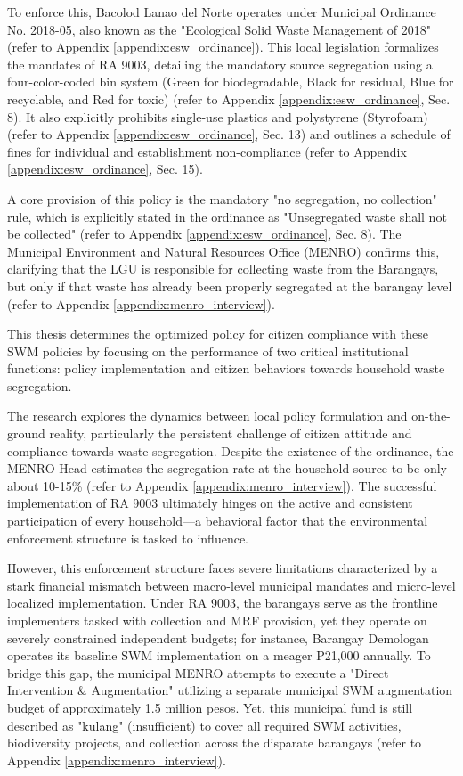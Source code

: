 To enforce this, Bacolod Lanao del Norte operates under Municipal Ordinance No. 2018-05, also known as the "Ecological Solid Waste Management of 2018" (refer to Appendix \ref{appendix:esw_ordinance}). This local legislation formalizes the mandates of RA 9003, detailing the mandatory source segregation using a four-color-coded bin system (Green for biodegradable, Black for residual, Blue for recyclable, and Red for toxic) (refer to Appendix \ref{appendix:esw_ordinance}, Sec. 8). It also explicitly prohibits single-use plastics and polystyrene (Styrofoam) (refer to Appendix \ref{appendix:esw_ordinance}, Sec. 13) and outlines a schedule of fines for individual and establishment non-compliance (refer to Appendix \ref{appendix:esw_ordinance}, Sec. 15).

A core provision of this policy is the mandatory "no segregation, no collection" rule, which is explicitly stated in the ordinance as "Unsegregated waste shall not be collected" (refer to Appendix \ref{appendix:esw_ordinance}, Sec. 8). The Municipal Environment and Natural Resources Office (MENRO) confirms this, clarifying that the LGU is responsible for collecting waste from the Barangays, but only if that waste has already been properly segregated at the barangay level (refer to Appendix \ref{appendix:menro_interview}).

This thesis determines the optimized policy for citizen compliance with these SWM policies by focusing on the performance of two critical institutional functions: policy implementation and citizen behaviors towards household waste segregation.

The research explores the dynamics between local policy formulation and on-the-ground reality, particularly the persistent challenge of citizen attitude and compliance towards waste segregation. Despite the existence of the ordinance, the MENRO Head estimates the segregation rate at the household source to be only about 10-15\% (refer to Appendix \ref{appendix:menro_interview}). The successful implementation of RA 9003 ultimately hinges on the active and consistent participation of every household—a behavioral factor that the environmental enforcement structure is tasked to influence.

However, this enforcement structure faces severe limitations characterized by a stark financial mismatch between macro-level municipal mandates and micro-level localized implementation. Under RA 9003, the barangays serve as the frontline implementers tasked with collection and MRF provision, yet they operate on severely constrained independent budgets; for instance, Barangay Demologan operates its baseline SWM implementation on a meager ₱21,000 annually. To bridge this gap, the municipal MENRO attempts to execute a "Direct Intervention \& Augmentation" utilizing a separate municipal SWM augmentation budget of approximately 1.5 million pesos. Yet, this municipal fund is still described as "kulang" (insufficient) to cover all required SWM activities, biodiversity projects, and collection across the disparate barangays (refer to Appendix \ref{appendix:menro_interview}). 

